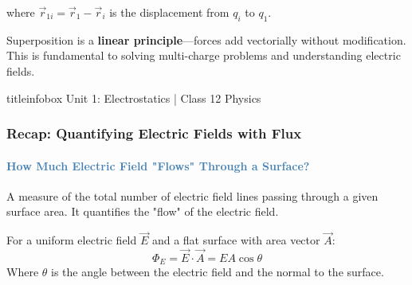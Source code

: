 \begin{frame}
\begin{examplebox}
\vspace{0.15cm}

where $\vec{r}_{1i} = \vec{r}_1 - \vec{r}_i$ is the displacement from $q_i$ to $q_1$.
\end{examplebox}

\vspace{0.25cm}

\begin{importantbox}
\vspace{0.05cm}
Superposition is a \textbf{linear principle}—forces add vectorially without modification. This is fundamental to solving multi-charge problems and understanding electric fields.
\vspace{0.05cm}
\end{importantbox}

\vfill

\begin{beamercolorbox}[wd=\textwidth,ht=0.5cm,dp=0.1cm,center]{titleinfobox}
    \small\color{coolgray} Unit 1: Electrostatics | Class 12 Physics
\end{beamercolorbox}

\begin{frame}
\frametitle{\textsf{\textbf{Recap: Quantifying Electric Fields with Flux}}}
\framesubtitle{\textcolor{steelblue}{How Much Electric Field "Flows" Through a Surface?}}

\vspace{-0.05cm}

\begin{keybox}
\vspace{0.1cm}
A measure of the total number of electric field lines passing through a given surface area. It quantifies the "flow" of the electric field.
\end{keybox}

\vspace{0.35cm}

\begin{formulabox}
\vspace{0.1cm}
For a uniform electric field $\vec{E}$ and a flat surface with area vector $\vec{A}$:
\begin{equation*}
    \Phi_E = \vec{E} \cdot \vec{A} = E A \cos\theta
\end{equation*}
Where $\theta$ is the angle between the electric field and the normal to the surface.
\vspace{0.1cm}
\end{formulabox}


\end{frame}
\end{frame}
